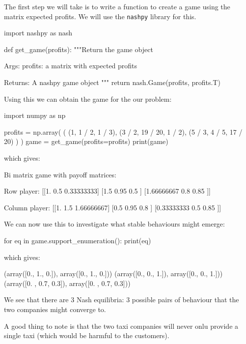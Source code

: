 The first step we will take is to write a function to create a game using the
matrix expected profits. We will use the \texttt{nashpy} library for
this.

\begin{pyin}
import nashpy as nash


def get_game(profits):
    """Return the game object

    Args:
        profits: a matrix with expected profits

    Returns:
        A nashpy game object
    """
    return nash.Game(profits, profits.T)
\end{pyin}

Using this we can obtain the game for the our problem:

\begin{pyin}
import numpy as np

profits = np.array(
    (
        (1, 1 / 2, 1 / 3),
        (3 / 2, 19 / 20, 1 / 2),
        (5 / 3, 4 / 5, 17 / 20)
    )
)
game = get_game(profits=profits)
print(game)
\end{pyin}

which gives:

\begin{pyout}
Bi matrix game with payoff matrices:

Row player:
[[1.         0.5        0.33333333]
 [1.5        0.95       0.5       ]
 [1.66666667 0.8        0.85      ]]

Column player:
[[1.         1.5        1.66666667]
 [0.5        0.95       0.8       ]
 [0.33333333 0.5        0.85      ]]
\end{pyout}

We can now use this to investigate what stable behaviours might emerge:

\begin{pyin}
for eq in game.support_enumeration():
    print(eq)
\end{pyin}

which gives:

\begin{pyout}
(array([0., 1., 0.]), array([0., 1., 0.]))
(array([0., 0., 1.]), array([0., 0., 1.]))
(array([0. , 0.7, 0.3]), array([0. , 0.7, 0.3]))
\end{pyout}

We see that there are 3 Nash equilibria: 3 possible pairs of behaviour that the
two companies might converge to.

A good thing to note is that the two taxi
companies will never onlu provide a single taxi (which would be harmful to the
customers).

